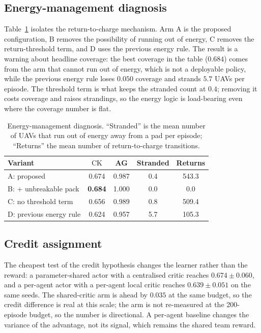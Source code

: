 \documentclass[conference]{IEEEtran}
\newcommand{\ck}{\mathrm{CK}}
\begin{document}
\subsection{Energy-management diagnosis}
Table~\ref{tab:energy} isolates the return-to-charge mechanism. Arm A is the proposed configuration, B removes the possibility of running out of energy, C removes the return-threshold term, and D uses the previous energy rule. The result is a warning about headline coverage: the best coverage in the table ($0.684$) comes from the arm that cannot run out of energy, which is not a deployable policy, while the previous energy rule loses $0.050$ coverage and strands $5.7$ UAVs per episode. The threshold term is what keeps the stranded count at $0.4$; removing it costs coverage and raises strandings, so the energy logic is load-bearing even where the coverage number is flat.

\begin{table}[t]
\caption{Energy-management diagnosis. ``Stranded'' is the mean number of UAVs that run out of energy away from a pad per episode; ``Returns'' the mean number of return-to-charge transitions.}
\label{tab:energy}
\centering
\small
\setlength{\tabcolsep}{3pt}
\begin{tabular}{@{}lcccc@{}}
\toprule
Variant & $\ck$ & AG & Stranded & Returns \\
\midrule
A: proposed & 0.674 & 0.987 & 0.4 & 543.3 \\
B: + unbreakable pack & \textbf{0.684} & 1.000 & 0.0 & 0.0 \\
C: no threshold term & 0.656 & 0.989 & 0.8 & 509.4 \\
D: previous energy rule & 0.624 & 0.957 & 5.7 & 105.3 \\
\bottomrule
\end{tabular}
\end{table}

\subsection{Credit assignment}
The cheapest test of the credit hypothesis changes the learner rather than the reward: a parameter-shared actor with a centralised critic reaches $0.674\pm0.060$, and a per-agent actor with a per-agent local critic reaches $0.639\pm0.051$ on the same seeds. The shared-critic arm is ahead by $0.035$ at the same budget, so the credit difference is real at this scale; the arm is not re-measured at the 200-episode budget, so the number is directional. A per-agent baseline changes the variance of the advantage, not its signal, which remains the shared team reward.
\end{document}
